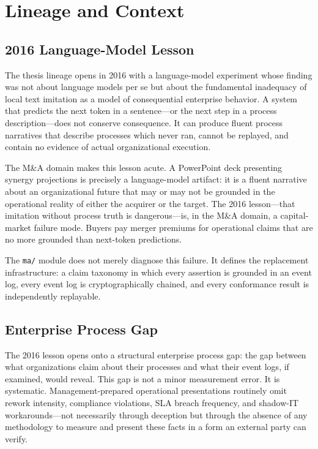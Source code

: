 
\section{Lineage and Context}
\label{sec:ma-lineage}

\subsection{2016 Language-Model Lesson}
\label{sec:ma-lineage-2016}

The thesis lineage opens in 2016 with a language-model experiment whose finding was not about
language models per se but about the fundamental inadequacy of local text imitation as a model
of consequential enterprise behavior. A system that predicts the next token in a sentence---or
the next step in a process description---does not conserve consequence. It can produce fluent
process narratives that describe processes which never ran, cannot be replayed, and contain
no evidence of actual organizational execution.

The M\&A domain makes this lesson acute. A PowerPoint deck presenting synergy projections is
precisely a language-model artifact: it is a fluent narrative about an organizational future
that may or may not be grounded in the operational reality of either the acquirer or the target.
The 2016 lesson---that imitation without process truth is dangerous---is, in the M\&A domain,
a capital-market failure mode. Buyers pay merger premiums for operational claims that are no
more grounded than next-token predictions.

The \texttt{ma/} module does not merely diagnose this failure. It defines the replacement
infrastructure: a claim taxonomy in which every assertion is grounded in an event log, every
event log is cryptographically chained, and every conformance result is independently replayable.

\subsection{Enterprise Process Gap}
\label{sec:ma-lineage-gap}

The 2016 lesson opens onto a structural enterprise process gap: the gap between what
organizations claim about their processes and what their event logs, if examined, would reveal.
This gap is not a minor measurement error. It is systematic. Management-prepared operational
presentations routinely omit rework intensity, compliance violations, SLA breach frequency,
and shadow-IT workarounds---not necessarily through deception but through the absence of any
methodology to measure and present these facts in a form an external party can verify.

